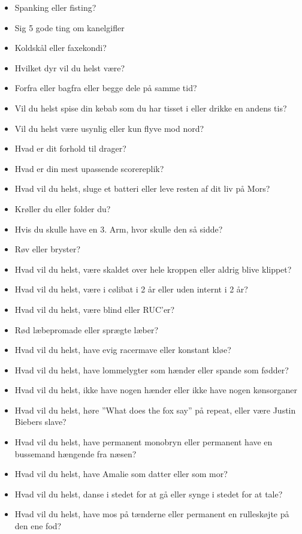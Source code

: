 \begin{itemize}
  \item Spanking eller fisting? 
  \item Sig 5 gode ting om kanelgifler 
  \item Koldskål eller faxekondi? 
  \item Hvilket dyr vil du helst være? 
  \item Forfra eller bagfra eller begge dele på samme tid? 
  \item Vil du helst spise din kebab som du har tisset i eller drikke en andens tis? 
  \item Vil du helst være usynlig eller kun flyve mod nord?
  \item Hvad er dit forhold til drager? 
  \item Hvad er din mest upassende scorereplik? 
  \item Hvad vil du helst, sluge et batteri eller leve resten af dit liv på Mors? 
  \item Krøller du eller folder du?
  \item Hvis du skulle have en 3. Arm, hvor skulle den så sidde? 
  \item Røv eller bryster? 
  \item Hvad vil du helst, være skaldet over hele kroppen eller aldrig blive klippet? 
  \item Hvad vil du helst, være i cølibat i 2 år eller uden internt i 2 år? 
  \item Hvad vil du helst, være blind eller RUC’er? 
  \item Rød læbepromade eller sprægte læber? 
  \item Hvad vil du helst, have evig racermave eller konstant kløe? 
  \item Hvad vil du helst, have lommelygter som hænder eller spande som fødder? 
  \item Hvad vil du helst, ikke have nogen hænder eller ikke have nogen kønsorganer 
  \item Hvad vil du helst, høre ”What does the fox say” på repeat, eller være Justin Biebers slave? 
  \item Hvad vil du helst, have permanent monobryn eller permanent have en bussemand hængende fra næsen? 
  \item Hvad vil du helst, have Amalie som datter eller som mor? 
  \item Hvad vil du helst, danse i stedet for at gå eller synge i stedet for at tale?
  \item Hvad vil du helst, have mos på tænderne eller permanent en rulleskøjte på den ene fod? 
\end{itemize}

